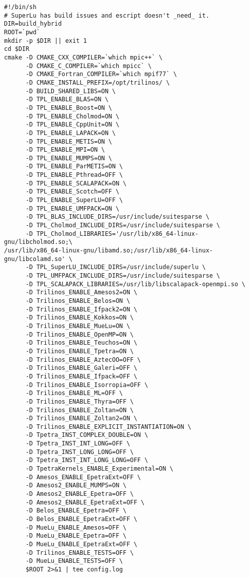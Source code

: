 \begin{verbatim}
#!/bin/sh
# SuperLu has build issues and escript doesn't _need_ it.
DIR=build_hybrid
ROOT=`pwd`
mkdir -p $DIR || exit 1
cd $DIR
cmake -D CMAKE_CXX_COMPILER=`which mpic++` \
      -D CMAKE_C_COMPILER=`which mpicc` \
      -D CMAKE_Fortran_COMPILER=`which mpif77` \
      -D CMAKE_INSTALL_PREFIX=/opt/trilinos/ \
      -D BUILD_SHARED_LIBS=ON \
      -D TPL_ENABLE_BLAS=ON \
      -D TPL_ENABLE_Boost=ON \
      -D TPL_ENABLE_Cholmod=ON \
      -D TPL_ENABLE_CppUnit=ON \
      -D TPL_ENABLE_LAPACK=ON \
      -D TPL_ENABLE_METIS=ON \
      -D TPL_ENABLE_MPI=ON \
      -D TPL_ENABLE_MUMPS=ON \
      -D TPL_ENABLE_ParMETIS=ON \
      -D TPL_ENABLE_Pthread=OFF \
      -D TPL_ENABLE_SCALAPACK=ON \
      -D TPL_ENABLE_Scotch=OFF \
      -D TPL_ENABLE_SuperLU=OFF \
      -D TPL_ENABLE_UMFPACK=ON \
      -D TPL_BLAS_INCLUDE_DIRS=/usr/include/suitesparse \
      -D TPL_Cholmod_INCLUDE_DIRS=/usr/include/suitesparse \
      -D TPL_Cholmod_LIBRARIES='/usr/lib/x86_64-linux-gnu/libcholmod.so;\
/usr/lib/x86_64-linux-gnu/libamd.so;/usr/lib/x86_64-linux-gnu/libcolamd.so' \
      -D TPL_SuperLU_INCLUDE_DIRS=/usr/include/superlu \
      -D TPL_UMFPACK_INCLUDE_DIRS=/usr/include/suitesparse \
      -D TPL_SCALAPACK_LIBRARIES=/usr/lib/libscalapack-openmpi.so \
      -D Trilinos_ENABLE_Amesos2=ON \
      -D Trilinos_ENABLE_Belos=ON \
      -D Trilinos_ENABLE_Ifpack2=ON \
      -D Trilinos_ENABLE_Kokkos=ON \
      -D Trilinos_ENABLE_MueLu=ON \
      -D Trilinos_ENABLE_OpenMP=ON \
      -D Trilinos_ENABLE_Teuchos=ON \
      -D Trilinos_ENABLE_Tpetra=ON \
      -D Trilinos_ENABLE_AztecOO=OFF \
      -D Trilinos_ENABLE_Galeri=OFF \
      -D Trilinos_ENABLE_Ifpack=OFF \
      -D Trilinos_ENABLE_Isorropia=OFF \
      -D Trilinos_ENABLE_ML=OFF \
      -D Trilinos_ENABLE_Thyra=OFF \
      -D Trilinos_ENABLE_Zoltan=ON \
      -D Trilinos_ENABLE_Zoltan2=ON \
      -D Trilinos_ENABLE_EXPLICIT_INSTANTIATION=ON \
      -D Tpetra_INST_COMPLEX_DOUBLE=ON \
      -D Tpetra_INST_INT_LONG=OFF \
      -D Tpetra_INST_LONG_LONG=OFF \
      -D Tpetra_INST_INT_LONG_LONG=OFF \
      -D TpetraKernels_ENABLE_Experimental=ON \
      -D Amesos_ENABLE_EpetraExt=OFF \
      -D Amesos2_ENABLE_MUMPS=ON \
      -D Amesos2_ENABLE_Epetra=OFF \
      -D Amesos2_ENABLE_EpetraExt=OFF \
      -D Belos_ENABLE_Epetra=OFF \
      -D Belos_ENABLE_EpetraExt=OFF \
      -D MueLu_ENABLE_Amesos=OFF \
      -D MueLu_ENABLE_Epetra=OFF \
      -D MueLu_ENABLE_EpetraExt=OFF \
      -D Trilinos_ENABLE_TESTS=OFF \
      -D MueLu_ENABLE_TESTS=OFF \
      $ROOT 2>&1 | tee config.log
\end{verbatim}
